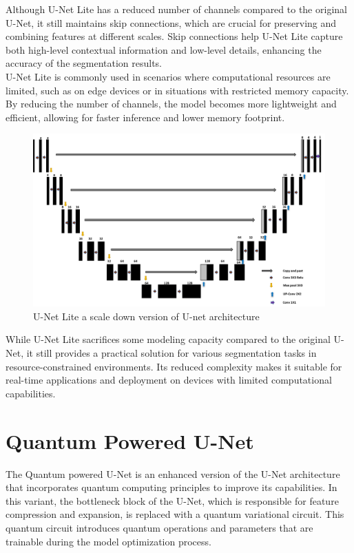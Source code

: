 \documentclass[conference]{IEEEtran}
\begin{document}
Although U-Net Lite has a reduced number of channels compared to the original U-Net, it still maintains skip connections, which are crucial for preserving and combining features at different scales. Skip connections help U-Net Lite capture both high-level contextual information and low-level details, enhancing the accuracy of the segmentation results.\\

U-Net Lite is commonly used in scenarios where computational resources are limited, such as on edge devices or in situations with restricted memory capacity. By reducing the number of channels, the model becomes more lightweight and efficient, allowing for faster inference and lower memory footprint.\\

\begin{figure}[]

\includegraphics[scale = .3]{Picture1.png}
\caption{U-Net Lite a scale down version of U-net architecture}
\label{fig .2}
\end{figure}

While U-Net Lite sacrifices some modeling capacity compared to the original U-Net, it still provides a practical solution for various segmentation tasks in resource-constrained environments. Its reduced complexity makes it suitable for real-time applications and deployment on devices with limited computational capabilities.\\


\section{Quantum Powered U-Net}
The Quantum powered U-Net is an enhanced version of the U-Net architecture that incorporates quantum computing principles to improve its capabilities. In this variant, the bottleneck block of the U-Net, which is responsible for feature compression and expansion, is replaced with a quantum variational circuit. This quantum circuit introduces quantum operations and parameters that are trainable during the model optimization process.\\
\end{document}
